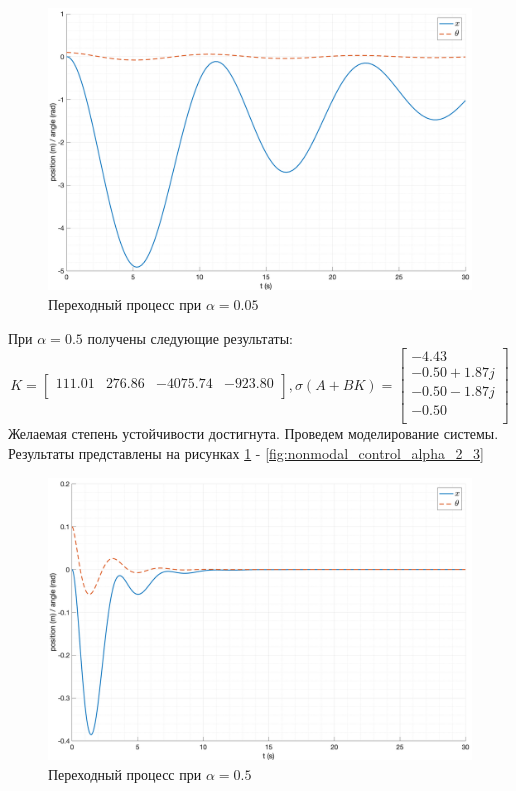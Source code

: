 \begin{figure}[ht!]
    \centering
    \includegraphics[width=\textwidth]{media/plots/nonmodal_controlers_min/out_4.png}
    \caption{Переходный процесс при $\alpha = 0.05$}
    \label{fig:nonmodal_control_alpha_2_1}
\end{figure}

\FloatBarrier
При $\alpha = 0.5$ получены следующие результаты: 
\begin{equation}
    K = \begin{bmatrix} 111.01  & 276.86  & -4075.74  & -923.80  \\ \end{bmatrix}, \sigma(A + BK) = \begin{bmatrix} -4.43 \\ -0.50 + 1.87j \\ -0.50 - 1.87j \\ -0.50 \\ \end{bmatrix}
\end{equation}
Желаемая степень устойчивости достигнута. Проведем моделирование системы. Результаты 
представлены на рисунках \ref{fig:nonmodal_control_alpha_2_1} - \ref{fig:nonmodal_control_alpha_2_3}

\begin{figure}[ht!]
    \centering
    \includegraphics[width=\textwidth]{media/plots/nonmodal_controlers_min/out_5.png}
    \caption{Переходный процесс при $\alpha = 0.5$}
    \label{fig:nonmodal_control_alpha_2_2}
\end{figure} 

